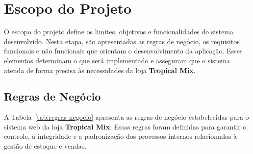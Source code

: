 \section{Escopo do Projeto}
O escopo do projeto define os limites, objetivos e funcionalidades do sistema desenvolvido. Nesta etapa, são apresentadas as regras de negócio, os requisitos funcionais e não funcionais que orientam o desenvolvimento da aplicação. Esses elementos determinam o que será implementado e asseguram que o sistema atenda de forma precisa às necessidades da loja \textbf{Tropical Mix}.


\subsection{Regras de Negócio}

A Tabela~\ref{tab:regras-negocio} apresenta as regras de negócio estabelecidas para o sistema web da loja \textbf{Tropical Mix}. Essas regras foram definidas para garantir o controle, a integridade e a padronização dos processos internos relacionados à gestão de estoque e vendas.


